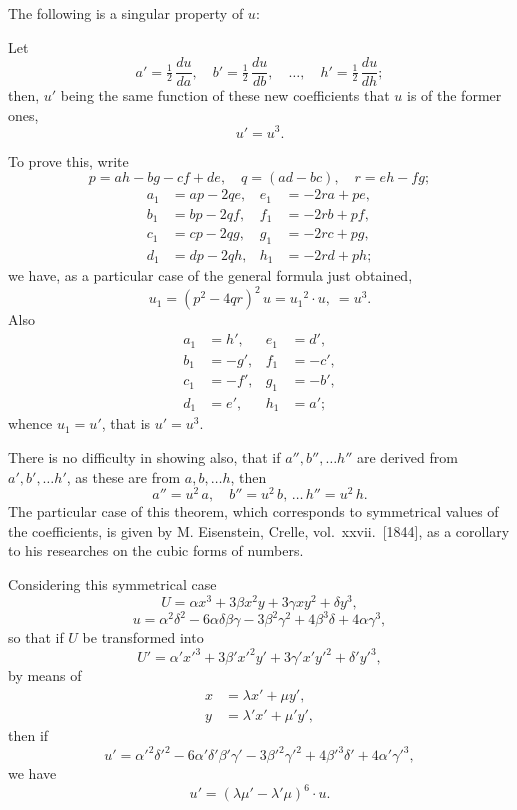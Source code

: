 \documentclass[11pt]{article}
\begin{document}
The following is a singular property of $u$:

Let
\[
a' = \tfrac{1}{2}\,\frac{du}{da},\quad b' = \tfrac{1}{2}\,\frac{du}{db},\quad \ldots,\quad h' = \tfrac{1}{2}\,\frac{du}{dh};
\]
then, $u'$ being the same function of these new coefficients that $u$ is of the former ones,
\[
u' = u^3.
\]

To prove this, write
\[
p = ah - bg - cf + de,\quad q = (ad - bc),\quad r = eh - fg;
\]
\[
\begin{aligned}
a_1 &= ap - 2qe, & e_1 &= -2ra + pe,\\
b_1 &= bp - 2qf, & f_1 &= -2rb + pf,\\
c_1 &= cp - 2qg, & g_1 &= -2rc + pg,\\
d_1 &= dp - 2qh, & h_1 &= -2rd + ph;
\end{aligned}
\]
we have, as a particular case of the general formula just obtained,
\[
u_1 = (p^2 - 4qr)^2\,u = u_1{}^2\cdot u,\ =u^3.
\]
Also
\[
\begin{aligned}
a_1 &= h', & e_1 &= d',\\
b_1 &= -g', & f_1 &= -c',\\
c_1 &= -f', & g_1 &= -b',\\
d_1 &= e', & h_1 &= a';
\end{aligned}
\]
whence $u_1 = u'$, that is $u' = u^3$.

There is no difficulty in showing also, that if $a'', b'', \ldots h''$ are derived from
$a', b', \ldots h'$, as these are from $a, b, \ldots h$, then
\[
a'' = u^2\,a,\quad b'' = u^2\,b,\,\ldots\,h'' = u^2\,h.
\]
The particular case of this theorem, which corresponds to symmetrical values of the
coefficients, is given by M. Eisenstein, Crelle, vol.~xxvii.~[1844], as a corollary to his
researches on the cubic forms of numbers.

Considering this symmetrical case
\[
U = \alpha x^3 + 3\beta x^2 y + 3\gamma x y^2 + \delta y^3,
\]
\[
u = \alpha^2\delta^2 - 6\alpha\delta\beta\gamma - 3\beta^2\gamma^2 + 4\beta^3\delta + 4\alpha\gamma^3,
\]
so that if $U$ be transformed into
\[
U' = \alpha' x'^3 + 3\beta' x'^2 y' + 3\gamma' x' y'^2 + \delta' y'^3,
\]
by means of
\[
\begin{aligned}
x &= \lambda x' + \mu y',\\
y &= \lambda' x' + \mu' y',
\end{aligned}
\]
then if
\[
u' = \alpha'^2\delta'^2 - 6\alpha'\delta'\beta'\gamma' - 3\beta'^2\gamma'^2 + 4\beta'^3\delta' + 4\alpha'\gamma'^3,
\]
we have
\[
u' = (\lambda\mu' - \lambda'\mu)^6 \cdot u.
\]
\end{document}
